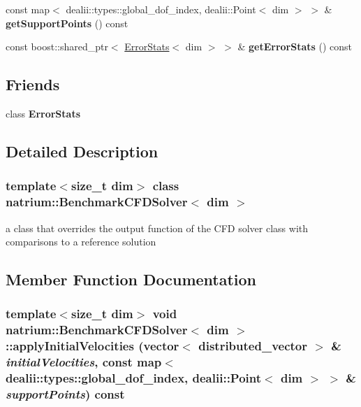 \begin{DoxyCompactItemize}
\item 
\hypertarget{classnatrium_1_1BenchmarkCFDSolver_a659524b149a3650b0f62186e59e385ec}{
const map$<$ dealii::types::global\_\-dof\_\-index, dealii::Point$<$ dim $>$ $>$ \& {\bfseries getSupportPoints} () const }
\label{classnatrium_1_1BenchmarkCFDSolver_a659524b149a3650b0f62186e59e385ec}

\item 
\hypertarget{classnatrium_1_1BenchmarkCFDSolver_abb3b4536d852415a4051c52507514ac2}{
const boost::shared\_\-ptr$<$ \hyperlink{classnatrium_1_1ErrorStats}{ErrorStats}$<$ dim $>$ $>$ \& {\bfseries getErrorStats} () const }
\label{classnatrium_1_1BenchmarkCFDSolver_abb3b4536d852415a4051c52507514ac2}

\end{DoxyCompactItemize}
\subsection*{Friends}
\begin{DoxyCompactItemize}
\item 
\hypertarget{classnatrium_1_1BenchmarkCFDSolver_a168e52694e19bf5c3e3136236b7b6888}{
class {\bfseries ErrorStats}}
\label{classnatrium_1_1BenchmarkCFDSolver_a168e52694e19bf5c3e3136236b7b6888}

\end{DoxyCompactItemize}


\subsection{Detailed Description}
\subsubsection*{template$<$size\_\-t dim$>$ class natrium::BenchmarkCFDSolver$<$ dim $>$}

a class that overrides the output function of the CFD solver class with comparisons to a reference solution 

\subsection{Member Function Documentation}
\hypertarget{classnatrium_1_1BenchmarkCFDSolver_a7883dcfd4469ae65ae62cad09ae5d160}{
\subsubsection[{applyInitialVelocities}]{\setlength{\rightskip}{0pt plus 5cm}template$<$size\_\-t dim$>$ void {\bf natrium::BenchmarkCFDSolver}$<$ dim $>$::applyInitialVelocities (vector$<$ distributed\_\-vector $>$ \& {\em initialVelocities}, \/  const map$<$ dealii::types::global\_\-dof\_\-index, dealii::Point$<$ dim $>$ $>$ \& {\em supportPoints}) const}}
\label{classnatrium_1_1BenchmarkCFDSolver_a7883dcfd4469ae65ae62cad09ae5d160}


